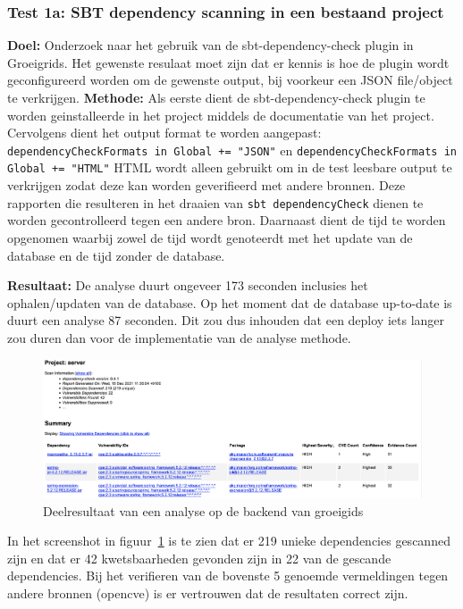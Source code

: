 \subsubsection{Test 1a: SBT dependency scanning in een bestaand project}
\textbf{Doel:} Onderzoek naar het gebruik van de sbt-dependency-check plugin in Groeigrids. Het gewenste resulaat moet zijn dat er kennis is hoe de plugin wordt geconfigureerd worden om de gewenste output, bij voorkeur een JSON file/object te verkrijgen.
\textbf{Methode:} Als eerste dient de sbt-dependency-check plugin te worden geinstalleerde in het project middels de documentatie van het project. Cervolgens dient het output format te worden aangepast: \texttt{dependencyCheckFormats in Global += "JSON"}
en \texttt{dependencyCheckFormats in Global += "HTML"} HTML wordt alleen gebruikt om in de test leesbare output te verkrijgen zodat deze kan worden geverifieerd met andere bronnen. Deze rapporten die resulteren in het draaien van \texttt{sbt dependencyCheck} dienen te worden gecontrolleerd tegen een andere bron. Daarnaast dient de tijd te worden opgenomen waarbij zowel de tijd wordt genoteerdt met het update van de database en de tijd zonder de database.

\textbf{Resultaat:} De analyse duurt ongeveer  173 seconden inclusies het ophalen/updaten  van de database. Op het moment dat de database up-to-date is duurt een analyse  87 seconden. Dit zou dus inhouden dat een deploy iets langer zou duren dan voor de implementatie van de analyse methode.
\begin{figure}[bth]
    \myfloatalign
    \includegraphics[width=15cm]{gfx/report_analyse_test1a_SBT}
    \caption{Deelresultaat van een analyse op de backend van groeigids}
    \label{fig:SBTReport1A}
\end{figure}

In het screenshot in figuur~\ref{fig:SBTReport1A} is te zien dat er 219 unieke dependencies gescanned zijn en dat er 42 kwetsbaarheden gevonden zijn in 22 van de gescande dependencies. Bij het verifieren van de bovenste 5 genoemde vermeldingen tegen andere bronnen (opencve) is er vertrouwen dat de resultaten correct zijn.
